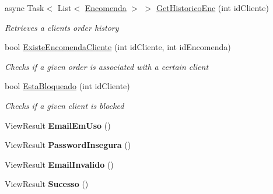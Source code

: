 \begin{DoxyCompactItemize}
async Task$<$ List$<$ \mbox{\hyperlink{classmvc_j_j_m_s_1_1_models_1_1_encomenda}{Encomenda}} $>$ $>$ \mbox{\hyperlink{classmvc_j_j_m_s_1_1_controllers_1_1_cliente_controller_a2023d96fe1797ec7673210da1233dfe2}{Get\+Historico\+Enc}} (int id\+Cliente)
\begin{DoxyCompactList}\small\item\em Retrieves a client\textquotesingle{}s order history \end{DoxyCompactList}\item 
bool \mbox{\hyperlink{classmvc_j_j_m_s_1_1_controllers_1_1_cliente_controller_a5ab387b5c0be1e73a0ec1c468cc3ac5e}{Existe\+Encomenda\+Cliente}} (int id\+Cliente, int id\+Encomenda)
\begin{DoxyCompactList}\small\item\em Checks if a given order is associated with a certain client \end{DoxyCompactList}\item 
bool \mbox{\hyperlink{classmvc_j_j_m_s_1_1_controllers_1_1_cliente_controller_ab916e41bf8757268e95796c1cf86d3df}{Esta\+Bloqueado}} (int id\+Cliente)
\begin{DoxyCompactList}\small\item\em Checks if a given client is blocked \end{DoxyCompactList}\item 
\mbox{\label{classmvc_j_j_m_s_1_1_controllers_1_1_cliente_controller_abe5a6649f29f0a35046839bad04523ef}} 
View\+Result {\bfseries Email\+Em\+Uso} ()
\item 
\mbox{\label{classmvc_j_j_m_s_1_1_controllers_1_1_cliente_controller_a5fcddb32b175cb22a90b8dbaca7a45bb}} 
View\+Result {\bfseries Password\+Insegura} ()
\item 
\mbox{\label{classmvc_j_j_m_s_1_1_controllers_1_1_cliente_controller_aa66f3fb47fd4c21a67514ef6a38a8390}} 
View\+Result {\bfseries Email\+Invalido} ()
\item 
\mbox{\label{classmvc_j_j_m_s_1_1_controllers_1_1_cliente_controller_ab65d2ba3cdb037df769d23b70216749d}} 
View\+Result {\bfseries Sucesso} ()
\item 
\mbox{\label{classmvc_j_j_m_s_1_1_controllers_1_1_cliente_controller_a8d1e06b92f61ed481fa342837fcd2e7f}} 

\end{DoxyCompactItemize}

